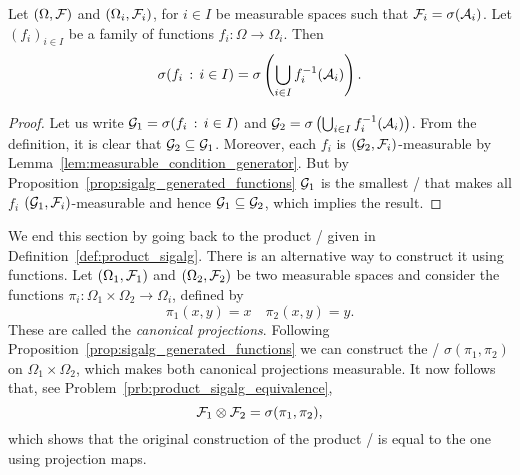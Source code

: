 \begin{proposition}\label{prop:extension_measurable_function}
Let $(\Omega, \mathcal F)$ and $(\Omega_i, \mathcal F_i)$, for $i \in I$ be measurable spaces such that $\mathcal F_i = \sigma(\mathcal A_i)$. Let $(f_i)_{i \in I}$ be a family of functions $f_i : \Omega \to \Omega_i$. Then 
\[
	\sigma(f_i \, : \, i \in I) = \sigma\left(\bigcup_{i \in I} f_i^{-1}(\mathcal A_i)\right).
\] 
\end{proposition}

\begin{proof}
Let us write $\mathcal G_1 = \sigma(f_i \, : \, i \in I)$ and $\mathcal G_2 = \sigma\left(\bigcup_{i \in I} f_i^{-1}(\mathcal A_i)\right)$. From the definition, it is clear that $\mathcal G_2 \subseteq \mathcal G_1$. Moreover, each $f_i$ is $(\mathcal G_2, \mathcal F_i)$-measurable by Lemma~\ref{lem:measurable_condition_generator}. But by Proposition~\ref{prop:sigalg_generated_functions} $\mathcal G_1$ is the smallest \sigalg/ that makes all $f_i$ $(\mathcal G_1, \mathcal F_i)$-measurable and hence $\mathcal G_1 \subseteq \mathcal G_2$, which implies the result.
\end{proof}

We end this section by going back to the product \sigalg/ given in Definition~\ref{def:product_sigalg}. There is an alternative way to construct it using functions. Let $(\Omega_1, \mathcal F_1)$ and $(\Omega_2, \mathcal F_2)$ be two measurable spaces and consider the functions $\pi_i : \Omega_1 \times \Omega_2 \to \Omega_i$, defined by 
\[
	\pi_1(x,y) = x \quad \pi_2(x,y) = y.
\]
These are called the \emph{canonical projections}. Following Proposition~\ref{prop:sigalg_generated_functions} we can construct the \sigalg/ $\sigma(\pi_1, \pi_2)$ on $\Omega_1 \times \Omega_2$, which makes both canonical projections measurable. It now follows that, see Problem~\ref{prb:product_sigalg_equivalence},
\begin{equation}\label{eq:product_sigalg_equivalence}
	\mathcal F_1 \otimes \mathcal F_2 = \sigma(\pi_1, \pi_2),
\end{equation}
which shows that the original construction of the product \sigalg/ is equal to the one using projection maps.

